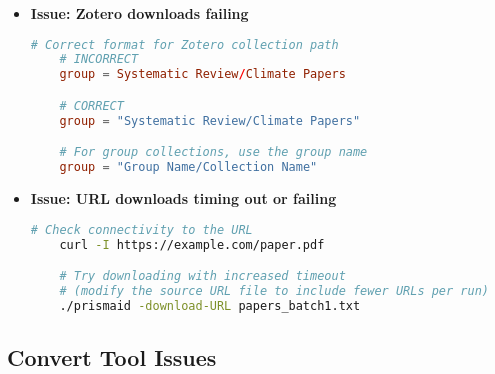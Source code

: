 \begin{itemize}
    \item \textbf{Issue: Zotero downloads failing}

    \begin{configbox}
    \begin{lstlisting}[language=TOML]
    # Correct format for Zotero collection path
    # INCORRECT
    group = Systematic Review/Climate Papers

    # CORRECT
    group = "Systematic Review/Climate Papers"

    # For group collections, use the group name
    group = "Group Name/Collection Name"
    \end{lstlisting}
    \end{configbox}


    \item \textbf{Issue: URL downloads timing out or failing}

    \begin{commandbox}
    \begin{lstlisting}[language=Bash]
    # Check connectivity to the URL
    curl -I https://example.com/paper.pdf

    # Try downloading with increased timeout
    # (modify the source URL file to include fewer URLs per run)
    ./prismaid -download-URL papers_batch1.txt
    \end{lstlisting}
    \end{commandbox}

\end{itemize}

\subsection{Convert Tool Issues}

